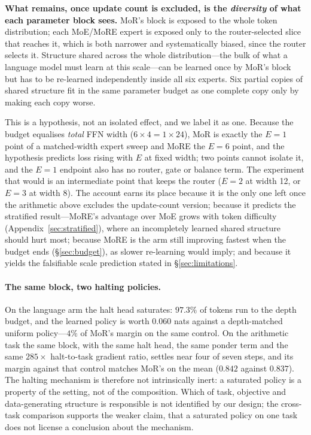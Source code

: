\textbf{What remains, once update count is excluded, is the \emph{diversity} of
what each parameter block sees.} MoR's block is exposed to the whole token
distribution; each MoE/MoRE expert is exposed only to the router-selected slice
that reaches it, which is both narrower and systematically biased, since the
router selects it. Structure shared across the whole distribution---the bulk of
what a language model must learn at this scale---can be learned once by MoR's
block but has to be re-learned independently inside all six experts. Six partial
copies of shared structure fit in the same parameter budget as one complete copy
only by making each copy worse.

This is a hypothesis, not an isolated effect, and we label it as one. Because the
budget equalises \emph{total} FFN width ($6 \times 4 = 1 \times 24$), MoR is
exactly the $E{=}1$ point of a matched-width expert sweep and MoRE the $E{=}6$
point, and the hypothesis predicts loss rising with $E$ at fixed width; two points
cannot isolate it, and the $E{=}1$ endpoint also has no router, gate or balance
term. The experiment that would is an intermediate point that keeps the router
($E{=}2$ at width 12, or $E{=}3$ at width 8). The
account earns its place because it is the only one left once the
arithmetic above excludes the update-count version; because it predicts the
stratified result---MoRE's advantage over MoE grows with token difficulty
(Appendix~\ref{sec:stratified}), where an incompletely learned shared structure should hurt
most; because MoRE is the arm still improving fastest when the budget ends
(\S\ref{sec:budget}), as slower re-learning would imply; and because it yields the
falsifiable scale prediction stated in \S\ref{sec:limitations}.

\paragraph{The same block, two halting policies.}
On the language arm the halt head saturates: $97.3\%$ of tokens run to the depth
budget, and the learned policy is worth $0.060$ nats against a depth-matched
uniform policy---$4\%$ of MoR's margin on the same control. On the arithmetic
task the same block, with the same halt head, the same ponder term and the same
$285\times$ halt-to-task gradient ratio, settles near four of seven steps, and
its margin against that control matches MoR's on the mean ($0.842$ against
$0.837$). The halting mechanism is therefore not intrinsically inert: a saturated
policy is a property of the setting, not of the composition. Which of task,
objective and data-generating structure is responsible is not identified by our
design; the cross-task comparison supports the weaker claim, that a saturated
policy on one task does not license a conclusion about the mechanism.


